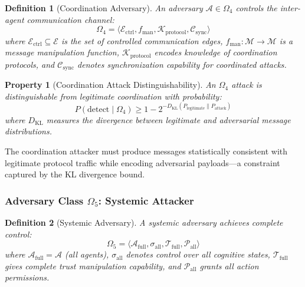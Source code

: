 \documentclass[
]{article}
\newtheorem{definition}{Definition}[section]
\newtheorem{property}{Property}[section]
\begin{document}
\begin{definition}[Coordination Adversary]
\label{def:omega4}
An adversary $\mathcal{A} \in \Omega_4$ controls the inter-agent communication channel:
\begin{equation}
\label{eq:omega4-formal}
\Omega_4 = \langle \mathcal{E}_{\text{ctrl}}, f_{\text{man}}, \mathcal{K}_{\text{protocol}}, \mathcal{C}_{\text{sync}} \rangle
\end{equation}
where $\mathcal{E}_{\text{ctrl}} \subseteq \mathcal{E}$ is the set of controlled communication edges, $f_{\text{man}}: \mathcal{M} \to \mathcal{M}$ is a message manipulation function, $\mathcal{K}_{\text{protocol}}$ encodes knowledge of coordination protocols, and $\mathcal{C}_{\text{sync}}$ denotes synchronization capability for coordinated attacks.
\end{definition}

\begin{property}[Coordination Attack Distinguishability]
\label{prop:omega4-distinguish}
An $\Omega_4$ attack is distinguishable from legitimate coordination with probability:
\begin{equation}
\label{eq:omega4-distinguish}
P(\text{detect} \mid \Omega_4) \geq 1 - 2^{-D_{\mathrm{KL}}(P_{\text{legitimate}} \| P_{\text{attack}})}
\end{equation}
where $D_{\mathrm{KL}}$ measures the divergence between legitimate and adversarial message distributions.
\end{property}

The coordination attacker must produce messages statistically consistent
with legitimate protocol traffic while encoding adversarial payloads---a
constraint captured by the KL divergence bound.

\subsubsection{\texorpdfstring{Adversary Class \(\Omega_5\): Systemic
Attacker}{Adversary Class Omega_5: Systemic Attacker}}\label{adversary-class-omega_5-systemic-attacker}

\begin{definition}[Systemic Adversary]
\label{def:omega5}
A systemic adversary achieves complete control:
\begin{equation}
\label{eq:omega5-formal}
\Omega_5 = \langle \mathcal{A}_{\text{full}}, \sigma_{\text{all}}, \mathcal{T}_{\text{full}}, \mathcal{P}_{\text{all}} \rangle
\end{equation}
where $\mathcal{A}_{\text{full}} = \mathcal{A}$ (all agents), $\sigma_{\text{all}}$ denotes control over all cognitive states, $\mathcal{T}_{\text{full}}$ gives complete trust manipulation capability, and $\mathcal{P}_{\text{all}}$ grants all action permissions.
\end{definition}
\end{document}
